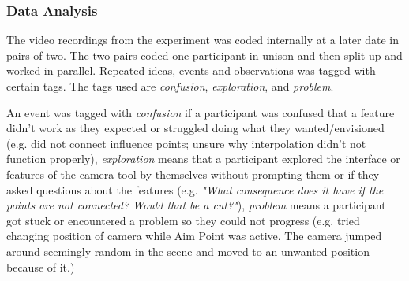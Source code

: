 \subsubsection{Data Analysis}
The video recordings from the experiment was coded internally at a later date in pairs of two. The two pairs coded one participant in unison and then split up and worked in parallel. Repeated ideas, events and observations was tagged with certain tags. The tags used are \textit{confusion}, \textit{exploration}, and \textit{problem}.

An event was tagged with \textit{confusion} if a participant was confused that a feature didn't work as they expected or struggled doing what they wanted/envisioned (e.g. did not connect influence points; unsure why interpolation didn't not function properly), 
\textit{exploration} means that a participant explored the interface or features of the camera tool by themselves without prompting them or if they asked questions about the features (e.g. \textit{"What consequence does it have if the points are not connected? Would that be a cut?"}), 
\textit{problem} means a participant got stuck or encountered a problem so they could not progress (e.g. tried changing position of camera while Aim Point was active. The camera jumped around seemingly random in the scene and moved to an unwanted position because of it.)